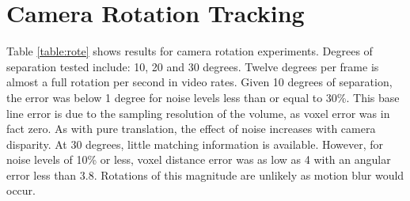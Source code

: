 \section{Camera Rotation Tracking}
\label{Sec:CamRoteTrackExp}

Table \ref{table:rote} shows results for camera rotation experiments. Degrees of separation tested include: 10, 20 and 30 degrees. Twelve degrees per frame is almost a full rotation per second in video rates. Given 10 degrees of separation, the error was below 1 degree for noise levels less than or equal to 30\%. This base line error is due to the sampling resolution of the volume, as voxel error was in fact zero. As with pure translation, the effect of noise increases with camera disparity. At 30 degrees, little matching information is available. However, for noise levels of 10\% or less, voxel distance error was as low as 4 with an angular error less than $3.8$. Rotations of this magnitude are unlikely as motion blur would occur.



